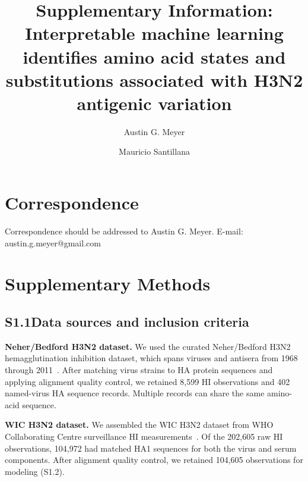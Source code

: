 \documentclass[12pt]{article}
\begin{document}
\title{Supplementary Information: Interpretable machine learning identifies amino acid states and substitutions associated with H3N2 antigenic variation}

\author[1,2]{Austin G. Meyer}
\author[3]{Mauricio Santillana}


\date{}

\maketitle

\section*{Correspondence}
Correspondence should be addressed to Austin G. Meyer. E-mail: austin.g.meyer@gmail.com

\section*{Supplementary Methods}

\subsection*{S1.1\quad Data sources and inclusion criteria}

\textbf{Neher/Bedford H3N2 dataset.} We used the curated Neher/Bedford H3N2 hemagglutination inhibition dataset, which spans viruses and antisera from 1968 through 2011~\cite{Neher2016PNAS}. After matching virus strains to HA protein sequences and applying alignment quality control, we retained 8,599 HI observations and 402 named-virus HA sequence records. Multiple records can share the same amino-acid sequence.

\textbf{WIC H3N2 dataset.} We assembled the WIC H3N2 dataset from WHO Collaborating Centre surveillance HI measurements~\cite{Harvey2023PLoSComputBiol}. Of the 202,605 raw HI observations, 104,972 had matched HA1 sequences for both the virus and serum components. After alignment quality control, we retained 104,605 observations for modeling (S1.2).
\end{document}
